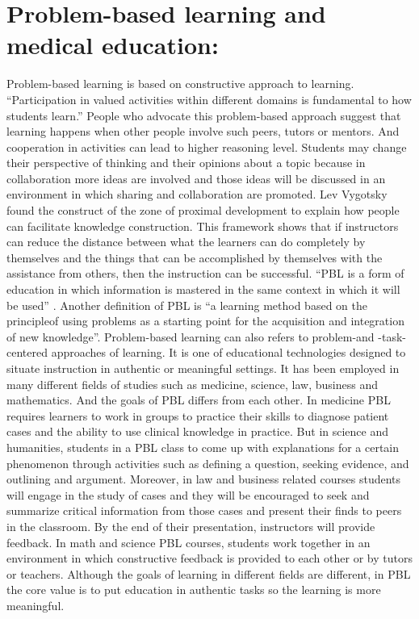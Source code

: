 \documentclass[sigconf]{acmart}
\begin{document}
\section{Problem-based learning and medical education:}
Problem-based learning is based on constructive approach to learning. ``Participation in valued activities within different domains is fundamental to how students learn.'' People who advocate this problem-based approach suggest that learning happens when other people involve such peers, tutors or mentors. And cooperation in activities can lead to higher reasoning level. Students may change their perspective of thinking and their opinions about a topic because in collaboration more ideas are involved and those ideas will be discussed in an environment in which sharing and collaboration are promoted. Lev Vygotsky found the construct of the zone of proximal development to explain how people can facilitate knowledge construction. This framework shows that if instructors can reduce the distance between what the learners can do completely by themselves and the things that can be accomplished by themselves with the assistance from others, then the instruction can be successful. ``PBL is a form of education in which information is mastered in the same context in which it will be used'' \cite{Donner1993}. Another definition of PBL is ``a learning method based on the principleof using problems as a starting point for the acquisition and integration of new knowledge''\cite{DIMansur2012}. Problem-based learning can also refers to problem-and -task-centered approaches of learning. It is one of educational technologies designed to situate instruction in authentic or meaningful settings. It has been employed in many different fields of studies such as medicine, science, law, business and mathematics. And the goals of PBL differs from each other. In medicine PBL requires learners to work in groups to practice their skills to diagnose patient cases and the ability to use clinical knowledge in practice. But in science and humanities, students in a PBL class to come up with explanations for a certain phenomenon through activities such as defining a question, seeking evidence, and outlining and argument. Moreover, in law and business related courses students will engage in the study of cases and they will be encouraged to seek and summarize critical information from those cases and present their finds to peers in the classroom. By the end of their presentation, instructors will provide feedback. In math and science PBL courses, students work together in an environment in which constructive feedback is provided to each other or by tutors or teachers. Although the goals of learning in different fields are different, in PBL the core value is to put education in authentic tasks so the learning is more meaningful.\\
\end{document}
